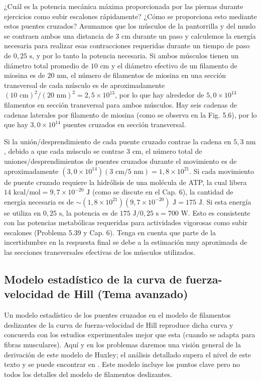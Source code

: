 \documentclass[12pt]{book}
\begin{document}
¿Cuál es la potencia mecánica máxima proporcionada por las piernas durante ejercicios como subir escalones rápidamente? ¿Cómo se proporciona esto mediante estos puentes cruzados? Asumamos que los músculos de la pantorrilla y del muslo se contraen ambos una distancia de $3\text{ cm}$ durante un paso y calculemos la energía necesaria para realizar esas contracciones requeridas durante un tiempo de paso de $0{,}25\text{ s}$, y por lo tanto la potencia necesaria. Si ambos músculos tienen un diámetro total promedio de $10\text{ cm}$ y el diámetro efectivo de un filamento de miosina es de $20\text{ nm}$, el número de filamentos de miosina en una sección transversal de cada músculo es de aproximadamente $(10\text{ cm})^2/(20\text{ nm})^2 = 2{,}5 \times 10^{13}$, por lo que hay alrededor de $5{,}0 \times 10^{13}$ filamentos en sección transversal para ambos músculos. Hay seis cadenas de cadenas laterales por filamento de miosina (como se observa en la Fig. 5.6), por lo que hay $3{,}0 \times 10^{14}$ puentes cruzados en sección transversal.

Si la unión/desprendimiento de cada puente cruzado contrae la cadena en $5{,}3\text{ nm}$, debido a que cada músculo se contrae $3\text{ cm}$, el número total de uniones/desprendimientos de puentes cruzados durante el movimiento es de aproximadamente $(3{,}0 \times 10^{14})(3\text{ cm}/5\text{ nm}) = 1{,}8 \times 10^{21}$. Si cada movimiento de puente cruzado requiere la hidrólisis de una molécula de ATP, la cual libera $14\text{ kcal/mol} = 9{,}7 \times 10^{-20}\text{ J}$ (como se discute en el Cap. 6), la cantidad de energía necesaria es de $\sim (1{,}8 \times 10^{21})(9{,}7 \times 10^{-20})\text{ J} = 175\text{ J}$. Si esta energía se utiliza en $0{,}25\text{ s}$, la potencia es de $175\text{ J}/0{,}25\text{ s} = 700\text{ W}$. Esto es consistente con las potencias metabólicas requeridas para actividades vigorosas como subir escalones (Problema 5.39 y Cap. 6). Tenga en cuenta que parte de la incertidumbre en la respuesta final se debe a la estimación muy aproximada de las secciones transversales efectivas de los músculos utilizados.

\subsection{Modelo estadístico de la curva de fuerza-velocidad de Hill (Tema avanzado)}

Un modelo estadístico de los puentes cruzados en el modelo de filamentos deslizantes de la curva de fuerza-velocidad de Hill reproduce dicha curva y concuerda con los estudios experimentales mejor que esta (cuando se adapta para fibras musculares). Aquí y en los problemas daremos una visión general de la derivación de este modelo de Huxley; el análisis detallado supera el nivel de este texto y se puede encontrar en \cite{19, 32, 36, 37, 38, 40, 41, 53}. Este modelo incluye los puntos clave pero no todos los detalles del modelo de filamentos deslizantes.
\end{document}
